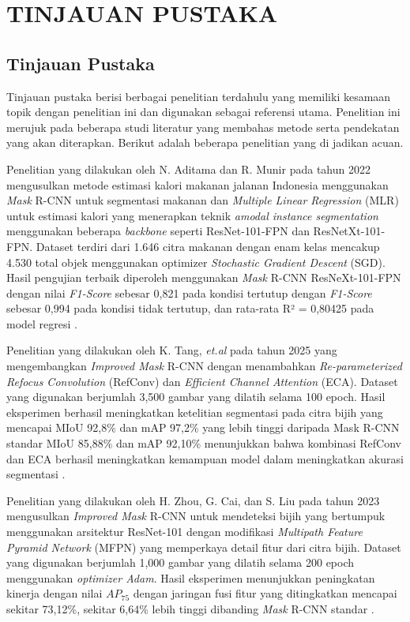\newpage
\chapter{TINJAUAN PUSTAKA} \label{Bab II}

\section{Tinjauan Pustaka} \label{II.Tinjauan}
Tinjauan pustaka berisi berbagai penelitian terdahulu yang memiliki kesamaan topik dengan penelitian ini dan digunakan sebagai referensi utama. Penelitian ini merujuk pada beberapa studi literatur yang membahas metode serta pendekatan yang akan diterapkan. Berikut adalah beberapa penelitian yang di jadikan acuan.\par

Penelitian yang dilakukan oleh N. Aditama dan R. Munir pada tahun 2022 mengusulkan metode estimasi kalori makanan jalanan Indonesia menggunakan \textit{Mask} R-CNN untuk segmentasi makanan dan \textit{Multiple Linear Regression} (MLR) untuk estimasi kalori yang menerapkan teknik \textit{amodal instance segmentation} menggunakan beberapa \textit{backbone} seperti ResNet-101-FPN dan ResNetXt-101-FPN. Dataset terdiri dari 1.646 citra makanan dengan enam kelas mencakup 4.530 total objek menggunakan optimizer \textit{Stochastic Gradient Descent} (SGD). Hasil pengujian terbaik diperoleh menggunakan \textit{Mask} R-CNN ResNeXt-101-FPN dengan nilai \textit{F1-Score} sebesar 0,821 pada kondisi tertutup dengan \textit{F1-Score} sebesar 0,994 pada kondisi tidak tertutup, dan rata-rata R² = 0,80425 pada model regresi \cite{FoodMaskRCNN10}. \par

Penelitian yang dilakukan oleh K. Tang, \textit{et.al} pada tahun 2025 yang mengembangkan \textit{Improved Mask} R-CNN dengan menambahkan  \textit{Re-parameterized Refocus Convolution} (RefConv) dan \textit{Efficient Channel Attention} (ECA). Dataset yang digunakan berjumlah 3,500 gambar yang dilatih selama 100 epoch. Hasil eksperimen berhasil meningkatkan ketelitian segmentasi pada citra bijih yang mencapai MIoU 92,8\% dan mAP 97,2\% yang lebih tinggi daripada Mask R-CNN standar MIoU 85,88\% dan mAP 92,10\% menunjukkan bahwa kombinasi RefConv dan ECA berhasil meningkatkan kemampuan model dalam meningkatkan akurasi segmentasi \cite{OreSegmentation2}. \par

Penelitian yang dilakukan oleh H. Zhou, G. Cai, dan S. Liu pada tahun 2023 mengusulkan \textit{Improved Mask} R-CNN untuk mendeteksi bijih yang bertumpuk menggunakan arsitektur ResNet-101 dengan modifikasi \textit{Multipath Feature Pyramid Network} (MFPN) yang memperkaya detail fitur dari citra bijih. Dataset yang digunakan berjumlah 1,000 gambar yang dilatih selama 200 epoch menggunakan \textit{optimizer Adam}. Hasil eksperimen menunjukkan peningkatan kinerja dengan nilai $AP_{75}$ dengan jaringan fusi fitur yang ditingkatkan mencapai sekitar 73,12\%, sekitar 6,64\% lebih tinggi dibanding \textit{Mask} R-CNN standar \cite{ImprovedMaskRCNNOrePanggangan}. \par

